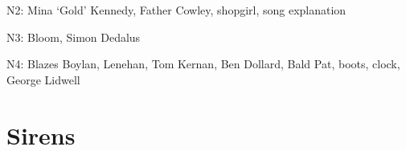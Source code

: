 N2: Mina ‘Gold’ Kennedy,
Father Cowley,
shopgirl,
song explanation

N3: Bloom,
Simon Dedalus

N4: Blazes Boylan,
Lenehan,
Tom Kernan,
Ben Dollard,
Bald Pat,
boots,
clock,
George Lidwell

\thispagestyle{empty}
\newpage


\setcounter{page}{1}

\section*{Sirens}




